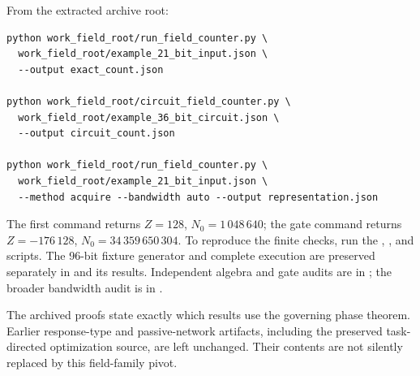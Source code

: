 \documentclass[11pt]{article}
\theoremstyle{remark}\newtheorem{remark}[theorem]{Remark}
\begin{document}
From the extracted archive root:
\begin{verbatim}
python work_field_root/run_field_counter.py \
  work_field_root/example_21_bit_input.json \
  --output exact_count.json

python work_field_root/circuit_field_counter.py \
  work_field_root/example_36_bit_circuit.json \
  --output circuit_count.json

python work_field_root/run_field_counter.py \
  work_field_root/example_21_bit_input.json \
  --method acquire --bandwidth auto --output representation.json
\end{verbatim}
The first command returns $Z=128$, $N_0=1\,048\,640$; the gate command returns $Z=-176\,128$, $N_0=34\,359\,650\,304$. To reproduce the finite checks, run the , ,  and  scripts. The 96-bit fixture generator and complete execution are preserved separately in  and its results. Independent algebra and gate audits are in ; the broader bandwidth audit is in .

The archived proofs state exactly which results use the governing phase theorem. Earlier response-type and passive-network artifacts, including the preserved task-directed optimization source, are left unchanged. Their contents are not silently replaced by this field-family pivot.
\end{document}
